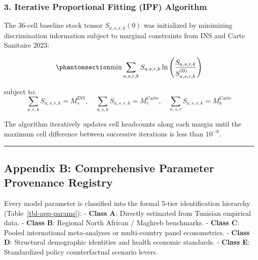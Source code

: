 \documentclass[
  11pt,
  a4paper]{article}
\begin{document}
\subsubsection{3. Iterative Proportional Fitting (IPF)
Algorithm}\label{iterative-proportional-fitting-ipf-algorithm}

The 36-cell baseline stock tensor \(S_{a,s,r,k}(0)\) was initialized by
minimizing discrimination information subject to marginal constraints
from INS and Carte Sanitaire 2023:

\begin{equation}\protect\phantomsection\label{eq-app-ipf}{\min \sum_{a,s,r,k} S_{a,s,r,k} \ln\left( \frac{S_{a,s,r,k}}{S_{a,s,r,k}^{(0)}} \right)}\end{equation}

subject to:
\[\sum_{a,r,k} S_{a,s,r,k} = M_{s}^{\text{INS}}, \quad \sum_{a,s,k} S_{a,s,r,k} = M_{r}^{\text{Carte}}, \quad \sum_{a,s,r} S_{a,s,r,k} = M_{k}^{\text{Carte}}\]

The algorithm iteratively updates cell headcounts along each margin
until the maximum cell difference between successive iterations is less
than \(10^{-6}\).

\begin{center}\rule{0.5\linewidth}{0.5pt}\end{center}

\subsection{Appendix B: Comprehensive Parameter Provenance
Registry}\label{sec-app-parameters}

Every model parameter is classified into the formal 5-tier
identification hierarchy (Table~\ref{tbl-app-params}): - \textbf{Class
A}: Directly estimated from Tunisian empirical data. - \textbf{Class B}:
Regional North African / Maghreb benchmarks. - \textbf{Class C}: Pooled
international meta-analyses or multi-country panel econometrics. -
\textbf{Class D}: Structural demographic identities and health economic
standards. - \textbf{Class E}: Standardized policy counterfactual
scenario levers.
\end{document}
